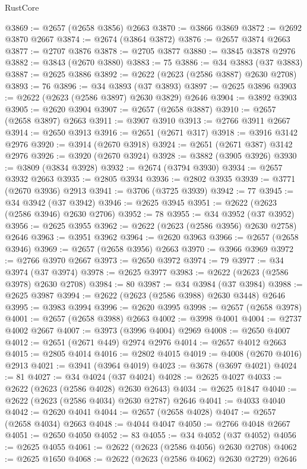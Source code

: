 \begin{lexlean}{RustCore}
\begin{coremodule}
@3869 := @2657 (@2658 @3856) @2663
@3870 := @3866 @3869
@3872 := @2692 @3870 @2667
@3874 := @2674 (@3864 @3872)
@3876 := @2657 @3874 @2663
@3877 := @2707 @3876
@3878 := @2705 @3877
@3880 := @3845 @3878 @2976
@3882 := @3843 (@2670 @3880)
@3883 := 75
@3886 := @34 @3883 (@37 @3883)
@3887 := @2625 @3886
@3892 := @2622 (@2623 (@2586 @3887) @2630 @2708)
@3893 := 76
@3896 := @34 @3893 (@37 @3893)
@3897 := @2625 @3896
@3903 := @2622 (@2623 (@2586 @3897) @2630 @3829) @2646
@3904 := @3892 @3903
@3905 := @2620 @3904
@3907 := @2657 (@2658 @3887)
@3910 := @2657 (@2658 @3897) @2663
@3911 := @3907 @3910
@3913 := @2766 @3911 @2667
@3914 := @2650 @3913
@3916 := @2651 (@2671 @317)
@3918 := @3916 @3142 @2976
@3920 := @3914 (@2670 @3918)
@3924 := @2651 (@2671 @387) @3142 @2976
@3926 := @3920 (@2670 @3924)
@3928 := @3882 (@3905 @3926)
@3930 := @3809 (@3834 @3928)
@3932 := @2674 (@3794 @3930)
@3934 := @2657 @3932 @2663
@3935 := @2805 @3934
@3936 := @2802 @3935
@3939 := @3771 (@2670 @3936) @2913
@3941 := @3706 (@3725 @3939)
@3942 := 77
@3945 := @34 @3942 (@37 @3942)
@3946 := @2625 @3945
@3951 := @2622 (@2623 (@2586 @3946) @2630 @2706)
@3952 := 78
@3955 := @34 @3952 (@37 @3952)
@3956 := @2625 @3955
@3962 := @2622 (@2623 (@2586 @3956) @2630 @2758) @2646
@3963 := @3951 @3962
@3964 := @2620 @3963
@3966 := @2657 (@2658 @3946)
@3969 := @2657 (@2658 @3956) @2663
@3970 := @3966 @3969
@3972 := @2766 @3970 @2667
@3973 := @2650 @3972
@3974 := 79
@3977 := @34 @3974 (@37 @3974)
@3978 := @2625 @3977
@3983 := @2622 (@2623 (@2586 @3978) @2630 @2708)
@3984 := 80
@3987 := @34 @3984 (@37 @3984)
@3988 := @2625 @3987
@3994 := @2622 (@2623 (@2586 @3988) @2630 @3448) @2646
@3995 := @3983 @3994
@3996 := @2620 @3995
@3998 := @2657 (@2658 @3978)
@4001 := @2657 (@2658 @3988) @2663
@4002 := @3998 @4001
@4004 := @2737 @4002 @2667
@4007 := @3973 (@3996 @4004) @2969
@4008 := @2650 @4007
@4012 := @2651 (@2671 @449) @2974 @2976
@4014 := @2657 @4012 @2663
@4015 := @2805 @4014
@4016 := @2802 @4015
@4019 := @4008 (@2670 @4016) @2913
@4021 := @3941 (@3964 @4019)
@4023 := @3678 (@3697 @4021)
@4024 := 81
@4027 := @34 @4024 (@37 @4024)
@4028 := @2625 @4027
@4033 := @2622 (@2623 (@2586 @4028) @2630 @2643)
@4034 := @2625 @1847
@4040 := @2622 (@2623 (@2586 @4034) @2630 @2787) @2646
@4041 := @4033 @4040
@4042 := @2620 @4041
@4044 := @2657 (@2658 @4028)
@4047 := @2657 (@2658 @4034) @2663
@4048 := @4044 @4047
@4050 := @2766 @4048 @2667
@4051 := @2650 @4050
@4052 := 83
@4055 := @34 @4052 (@37 @4052)
@4056 := @2625 @4055
@4061 := @2622 (@2623 (@2586 @4056) @2630 @2708)
@4062 := @2625 @1650
@4068 := @2622 (@2623 (@2586 @4062) @2630 @2729) @2646

\end{coremodule}
\end{lexlean}
